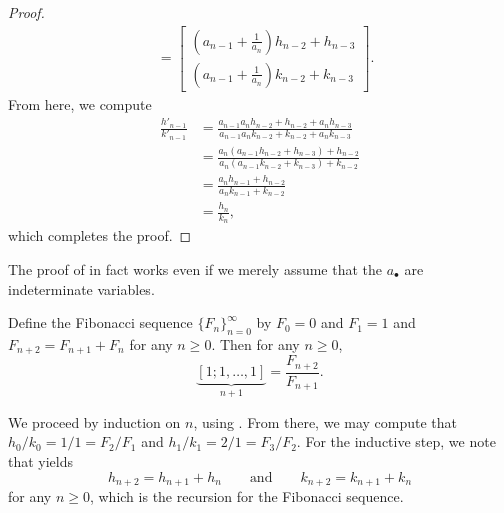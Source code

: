 \documentclass[../notes.tex]{subfiles}
\begin{document}
\begin{proof}
\begin{align*}
		&= \begin{bmatrix}
			\left(a_{n-1}+\frac1{a_n}\right)h_{n-2}+h_{n-3} \\
			\left(a_{n-1}+\frac1{a_n}\right)k_{n-2}+k_{n-3}
		\end{bmatrix}.
	\end{align*}
	From here, we compute
	\begin{align*}
		\frac{h'_{n-1}}{k'_{n-1}} &= \frac{a_{n-1}a_nh_{n-2}+h_{n-2}+a_nh_{n-3}}{a_{n-1}a_nk_{n-2}+k_{n-2}+a_nk_{n-3}} \\
		&= \frac{a_n(a_{n-1}h_{n-2}+h_{n-3})+h_{n-2}}{a_n(a_{n-1}k_{n-2}+k_{n-3})+k_{n-2}} \\
		&= \frac{a_nh_{n-1}+h_{n-2}}{a_nk_{n-1}+k_{n-2}} \\
		&= \frac{h_n}{k_n},
	\end{align*}
	which completes the proof.
\end{proof}
\begin{remark}
	The proof of  in fact works even if we merely assume that the $a_\bullet$ are indeterminate variables.
\end{remark}
\begin{example} \label{ex:cf-fib}
	Define the Fibonacci sequence $\{F_n\}_{n=0}^\infty$ by $F_0=0$ and $F_1=1$ and $F_{n+2}=F_{n+1}+F_n$ for any $n\ge0$. Then for any $n\ge0$,
	\[\underbrace{[1;1,\ldots,1]}_{n+1}=\frac{F_{n+2}}{F_{n+1}}.\]
\end{example}
\begin{solution}
	We proceed by induction on $n$, using . From there, we may compute that $h_0/k_0=1/1=F_2/F_1$ and $h_1/k_1=2/1=F_3/F_2$. For the inductive step, we note that  yields
	\[h_{n+2}=h_{n+1}+h_n\qquad\text{and}\qquad k_{n+2}=k_{n+1}+k_n\]
	for any $n\ge0$, which is the recursion for the Fibonacci sequence.
\end{solution}
\end{document}

